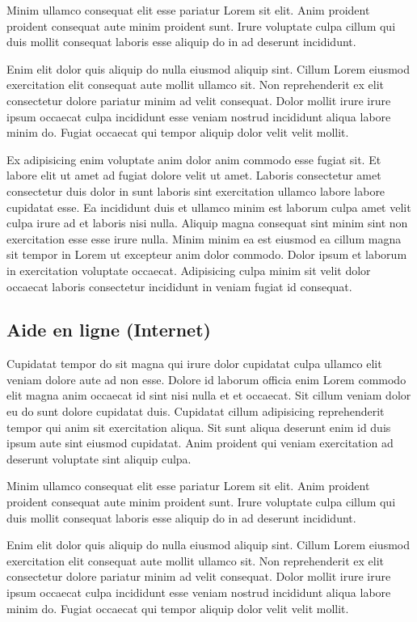 \documentclass[a4paper,10pt,french]{sphinxmanual}
\begin{document}
Minim ullamco consequat elit esse pariatur Lorem sit elit. Anim proident proident consequat aute minim proident sunt. Irure voluptate culpa cillum qui duis mollit consequat laboris esse aliquip do in ad deserunt incididunt.

Enim elit dolor quis aliquip do nulla eiusmod aliquip sint. Cillum Lorem eiusmod exercitation elit consequat aute mollit ullamco sit. Non reprehenderit ex elit consectetur dolore pariatur minim ad velit consequat. Dolor mollit irure irure ipsum occaecat culpa incididunt esse veniam nostrud incididunt aliqua labore minim do. Fugiat occaecat qui tempor aliquip dolor velit velit mollit.

Ex adipisicing enim voluptate anim dolor anim commodo esse fugiat sit. Et labore elit ut amet ad fugiat dolore velit ut amet. Laboris consectetur amet consectetur duis dolor in sunt laboris sint exercitation ullamco labore labore cupidatat esse. Ea incididunt duis et ullamco minim est laborum culpa amet velit culpa irure ad et laboris nisi nulla. Aliquip magna consequat sint minim sint non exercitation esse esse irure nulla. Minim minim ea est eiusmod ea cillum magna sit tempor in Lorem ut excepteur anim dolor commodo. Dolor ipsum et laborum in exercitation voluptate occaecat. Adipisicing culpa minim sit velit dolor occaecat laboris consectetur incididunt in veniam fugiat id consequat.


\subsection{Aide en ligne (Internet)}
\label{\detokenize{docs/refs/start/install/installation-osx:aide-en-ligne-internet}}
Cupidatat tempor do sit magna qui irure dolor cupidatat culpa ullamco elit veniam dolore aute ad non esse. Dolore id laborum officia enim Lorem commodo elit magna anim occaecat id sint nisi nulla et et occaecat. Sit cillum veniam dolor eu do sunt dolore cupidatat duis. Cupidatat cillum adipisicing reprehenderit tempor qui anim sit exercitation aliqua. Sit sunt aliqua deserunt enim id duis ipsum aute sint eiusmod cupidatat. Anim proident qui veniam exercitation ad deserunt voluptate sint aliquip culpa.

Minim ullamco consequat elit esse pariatur Lorem sit elit. Anim proident proident consequat aute minim proident sunt. Irure voluptate culpa cillum qui duis mollit consequat laboris esse aliquip do in ad deserunt incididunt.

Enim elit dolor quis aliquip do nulla eiusmod aliquip sint. Cillum Lorem eiusmod exercitation elit consequat aute mollit ullamco sit. Non reprehenderit ex elit consectetur dolore pariatur minim ad velit consequat. Dolor mollit irure irure ipsum occaecat culpa incididunt esse veniam nostrud incididunt aliqua labore minim do. Fugiat occaecat qui tempor aliquip dolor velit velit mollit.
\end{document}
